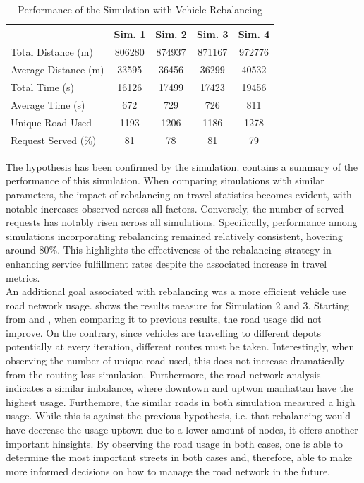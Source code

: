 \begin{table}[h]
	\centering
	\begin{tabular}{ |p{3.7cm}|c|c|c|c|}
		\hline
		& Sim. 1 & Sim. 2 & Sim. 3 & Sim. 4   \\
		\hline
		Total Distance (m)     &806280&   874937 & 871167 &  972776 \\
		Average Distance (m)  &33595 & 36456  &36299  & 40532 \\
		Total Time (s)         &16126&17499   &  17423& 19456 \\
		Average Time (s)      & 672&  729  & 726 &  811\\
		Unique Road Used 				&1193&1206&1186&1278 \\
		Request Served  (\%)&81 &  78 &  81& 79 \\
	\end{tabular}
	
	\caption{Performance of the Simulation with Vehicle Rebalancing }
	\label{tab:rebalancing_simulation}   
\end{table}
The hypothesis has been confirmed by the simulation.  contains a summary of the performance of this simulation. When comparing simulations with similar parameters, the impact of rebalancing on travel statistics becomes evident, with notable increases observed across all factors. Conversely, the number of served requests has notably risen across all simulations. Specifically, performance among simulations incorporating rebalancing remained relatively consistent, hovering around 80\%. This highlights the effectiveness of the rebalancing strategy in enhancing service fulfillment rates despite the associated increase in travel metrics. \\
An additional goal associated with rebalancing was a more efficient vehicle use road network usage.  shows the results measure for Simulation 2 and 3. Starting from  and , when comparing it to previous results, the road usage did not improve. On the contrary, since vehicles are travelling to different depots potentially at every iteration, different routes must be taken. Interestingly, when observing the number of unique road used, this does not increase dramatically from the routing-less simulation. Furthermore, the road network analysis indicates a similar imbalance, where downtown and uptwon manhattan have the highest usage. Furthemore, the similar roads in both simulation measured a high usage. While this is against the previous hypothesis, i.e. that rebalancing would have decrease the usage uptown due to a lower amount of nodes, it offers another important hinsights. By observing the road usage in both cases, one is able to determine the most important streets in both cases and, therefore, able to make more informed decisions on how to manage the road network in the future. \\
